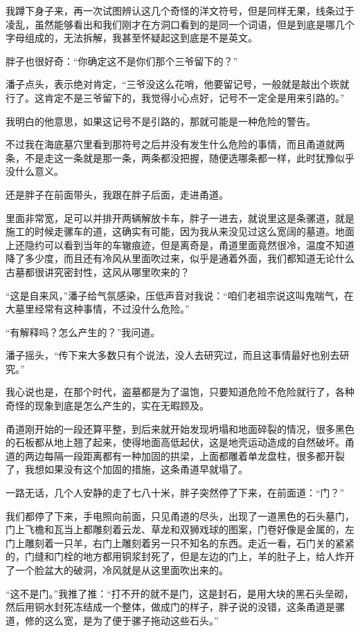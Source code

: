 我蹲下身子来，再一次试图辨认这几个奇怪的洋文符号，但是同样无果，线条过于凌乱，虽然能够看出和我们刚才在方洞口看到的是同一个词语，但是到底是哪几个字母组成的，无法拆解，我甚至怀疑起这到底是不是英文。

胖子也很好奇：“你确定这不是你们那个三爷留下的？”

潘子点头，表示绝对肯定，“三爷没这么花哨，他要留记号，一般就是敲出个崁就行了。这肯定不是三爷留下的，我觉得小心点好，记号不一定全是用来引路的。”

我明白的他意思，如果这记号不是引路的，那就可能是一种危险的警告。

不过我在海底墓穴里看到那符号之后并没有发生什么危险的事情，而且甬道就两条，不是走这一条就是那一条，两条都没把握，随便选哪条都一样，此时犹豫似乎没什么意义。

还是胖子在前面带头，我跟在胖子后面，走进甬道。

里面非常宽，足可以并排开两辆解放卡车，胖子一进去，就说里这是条骡道，就是施工的时候走骡车的道，这确实有可能，因为我从来没见过这么宽阔的墓道。地面上还隐约可以看到当年的车辙痕迹，但是离奇是，甬道里面竟然很冷，温度不知道降了多少度，而且还有冷风从里面吹过来，似乎是通着外面，我们都知道无论什么古墓都很讲究密封性，这风从哪里吹来的？

“这是自来风，”潘子给气氛感染，压低声音对我说：“咱们老祖宗说这叫鬼喘气，在大墓里经常有这种事情，不过没什么危险。”

“有解释吗？怎么产生的？”我问道。

潘子摇头，“传下来大多数只有个说法，没人去研究过，而且这事情最好也别去研究。”

我心说也是，在那个时代，盗墓都是为了温饱，只要知道危险不危险就行了，各种奇怪的现象到底是怎么产生的，实在无暇顾及。

甬道刚开始的一段还算平整，到后来就开始发现坍塌和地面碎裂的情况，很多黑色的石板都从地上翘了起来，使得地面高低起伏，这是地壳运动造成的自然破坏。甬道的两边每隔一段距离都有一种加固的拱梁，上面都雕着单龙盘柱，很多都开裂了，我想如果没有这个加固的措施，这条甬道早就塌了。

一路无话，几个人安静的走了七八十米，胖子突然停了下来，在前面道：“门？”

我们都停了下来，手电照向前面，只见甬道的尽头，出现了一道黑色的石头墓门，门上飞檐和瓦当上都雕刻着云龙、草龙和双狮戏球的图案，门卷好像是金属的，左门上雕刻着一只羊，右门上雕刻着另一只不知名的东西。走近一看，石门关的紧紧的，门缝和门栓的地方都用铜浆封死了，但是左边的门上，羊的肚子上，给人炸开了一个脸盆大的破洞，冷风就是从这里面吹出来的。

“这不是门。”我推了推：“打不开的就不是门，这是封石，是用大块的黑石头垒砌，然后用铜水封死冻结成一个整体，做成门的样子，胖子说的没错，这条甬道是骡道，修的这么宽，是为了便于骡子拖动这些石头。”

